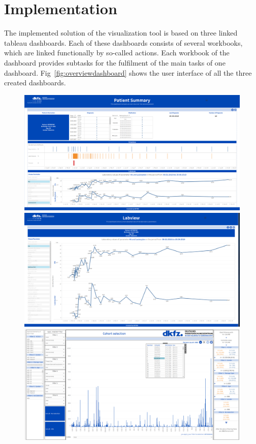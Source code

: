 \documentclass[aac,crcready]{iosart2x}
\begin{document}
\section{Implementation}\label{s4}
%
The implemented solution of the visualization tool is based on three linked tableau dashboards. Each of these dashboards consists of several workbooks, which are linked functionally by so-called actions. Each workbook of the dashboard provides subtasks for the fulfilment of the main tasks of one dashboard. Fig~\ref{fig:overviewdashboard} shows the user interface of all the three created dashboards.

\begin{figure}[ht]
   \begin{minipage}[b]{.5\linewidth}          \includegraphics[width=1.05\textwidth]{images/Pat sum.png}
   \end{minipage}%
   \hfill
   \begin{minipage}[b]{.5\linewidth} 
 \includegraphics[width=1.05\textwidth]{images/Labview.png} 
   \end{minipage}%
   \vfill
      \begin{minipage}[b]{\linewidth}          \includegraphics[width=1.05\textwidth]{images/ch sel.png}

\end{minipage}
\end{figure}
\end{document}
